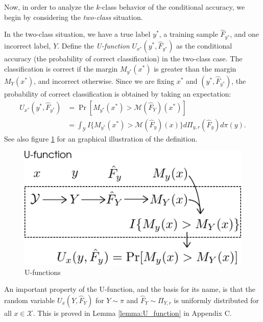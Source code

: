 \documentclass[12pt]{article}
\begin{document}
Now, in order to analyze the $k$-class behavior of the conditional
accuracy, we begin by considering the \emph{two-class} situation.

In the two-class situation, we have a true label $y^*$, a training
sample $\hat{F}_{y^*}$, and one incorrect label, $Y$.  Define the
\emph{U-function} $U_{x^*}(y^*, \hat{F}_{y^*})$ as the conditional
accuracy (the probability of correct classification) in the two-class
case.  The classification is correct if the margin $M_{y^*}(x^*)$ is
greater than the margin $M_Y(x^*)$, and incorrect otherwise.  Since we
are fixing $x^*$ and $(y^*, \hat{F}_{y^*})$, the probability of
correct classification is obtained by taking an expectation:
\begin{align}\label{eq:U_function}
U_{x^*}(y^*, \hat{F}_{y^*}) &= \Pr[M_{y^*}(x^*) > \mathcal{M}(\hat{F}_Y)(x^*)]
\\&= \int_{\mathcal{Y}} 
I\{
M_{y^*}(x^*) > \mathcal{M}(\hat{F}_{y})(x)
\}
d\Pi_{y, r}(\hat{F}_y)
d\pi(y).
\end{align}
See also figure \ref{fig:U_function} for an graphical illustration of
the definition.

\begin{figure}[h]
\centering
\includegraphics[scale = 0.4]{U_function.png}
\caption{U-functions}\label{fig:U_function}
\end{figure}

An important property of the U-function, and the basis for its name,
is that the random variable $U_x(Y, \hat{F}_Y)$ for $Y \sim \pi$ and
$\hat{F}_Y \sim \Pi_{Y, r}$ is uniformly distributed for all
$x \in \mathcal{X}$.  This is proved in Lemma \ref{lemma:U_function}
in Appendix C.
\end{document}
